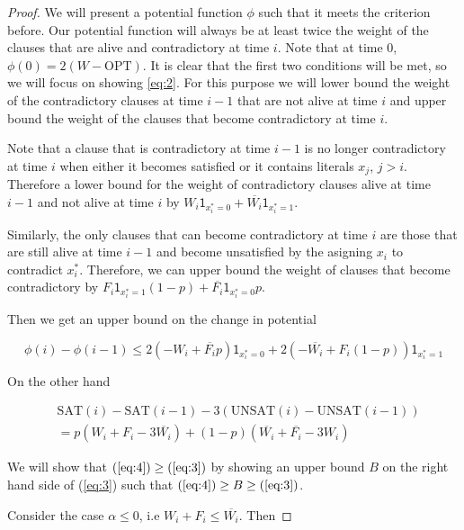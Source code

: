 \documentclass[11pt,letter]{article}
\numberwithin{theorem}{section}
\begin{document}
\begin{proof}
We will present a potential function $\phi$ such that it meets the criterion before. Our potential function will always
 be at least twice the weight of the clauses that are alive and contradictory at time $i$. Note that at time $0$,
 $\phi(0) = 2(W-\textrm{OPT})$. It is clear that the first two conditions will be met, so we will focus on showing \ref{eq:2}.
 For this purpose we will lower bound the weight of the contradictory clauses at time $i-1$ that are not alive at time $i$
 and upper bound the weight of the clauses that become contradictory at time $i$.

Note that a clause that is contradictory at time $i-1$ is no longer contradictory at time $i$ when either it becomes satisfied
or it contains literals $x_j$, $j > i$. Therefore a lower bound for the weight of contradictory clauses alive at time $i-1$ and
 not alive at time $i$ by $W_i \mathsf{1}_{x_i^* = 0} + \overline{W_i} \mathsf{1}_{x_i^* = 1}$.

Similarly, the only clauses that can become contradictory at time $i$ are those that are still alive at time $i-1$ and become unsatisfied
 by the asigning $x_i$ to contradict $x_i^*$. Therefore, we can upper bound the weight of clauses that become contradictory by
 $F_i \mathsf{1}_{x_i^* = 1} (1-p) + \overline{F_i} \mathsf{1}_{x_i^* = 0}p$.

Then we get an upper bound on the change in potential

\begin{equation}
\label{eq:3}
\phi(i) - \phi(i-1) \leq 2(-W_i + \overline{F_i} p) \mathsf{1}_{x_i^* = 0} + 2(-\overline{W_i} + F_i(1-p))\mathsf{1}_{x_i^* = 1}
\end{equation}

On the other hand

\begin{equation}
\begin{aligned}
\label{eq:4}
& \textrm{SAT}(i) - \textrm{SAT}(i-1) - 3(\textrm{UNSAT}(i) - \textrm{UNSAT}(i-1)) \\
& = p(W_i + F_i - 3\overline{W_i}) + (1-p)(\overline{W_i} + \overline{F_i} - 3W_i)
\end{aligned}
\end{equation}

We will show that $(\ref{eq:4}) \geq (\ref{eq:3})$ by showing an upper bound $B$ on the right hand side of (\ref{eq:3}) such that $(\ref{eq:4}) \geq B \geq (\ref{eq:3})$.

Consider the case $\alpha \leq 0$, i.e $W_i + F_i \leq \overline{W_i}$. Then 


\end{proof}
\end{document}
